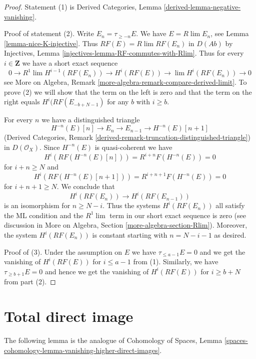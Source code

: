\begin{proof}
Statement (1) is
Derived Categories, Lemma \ref{derived-lemma-negative-vanishing}.

\medskip\noindent
Proof of statement (2). Write $E_n = \tau_{\geq -n}E$. We have
$E = R\lim E_n$, see Lemma \ref{lemma-nice-K-injective}. Thus
$RF(E) = R\lim RF(E_n)$ in $D(\textit{Ab})$ by Injectives, Lemma
\ref{injectives-lemma-RF-commutes-with-Rlim}. Thus for every $i \in \mathbf{Z}$
we have a short exact sequence
$$
0 \to R^1\lim H^{i - 1}(RF(E_n)) \to H^i(RF(E)) \to \lim H^i(RF(E_n)) \to 0
$$
see More on Algebra, Remark
\ref{more-algebra-remark-compare-derived-limit}.
To prove (2) we will show that the term on the left is zero
and that the term on the right equals $H^i(RF(E_{-b + N - 1})$
for any $b$ with $i \geq b$.

\medskip\noindent
For every $n$ we have a distinguished triangle
$$
H^{-n}(E)[n] \to E_n \to E_{n - 1} \to H^{-n}(E)[n + 1]
$$
(Derived Categories, Remark
\ref{derived-remark-truncation-distinguished-triangle})
in $D(\mathcal{O}_X)$. Since $H^{-n}(E)$ is quasi-coherent we have
$$
H^i(RF(H^{-n}(E)[n])) = R^{i + n}F(H^{-n}(E)) = 0
$$
for $i + n \geq N$ and
$$
H^i(RF(H^{-n}(E)[n + 1])) = R^{i + n + 1}F(H^{-n}(E)) = 0
$$
for $i + n + 1 \geq N$. We conclude that
$$
H^i(RF(E_n)) \to H^i(RF(E_{n - 1}))
$$
is an isomorphism for $n \geq N - i$. Thus the systems $H^i(RF(E_n))$ all
satisfy the ML condition and the $R^1\lim$ term in our short exact
sequence is zero (see discussion in
More on Algebra, Section \ref{more-algebra-section-Rlim}).
Moreover, the system $H^i(RF(E_n))$ is constant starting
with $n = N - i - 1$ as desired.

\medskip\noindent
Proof of (3). Under the assumption on $E$ we have
$\tau_{\leq a - 1}E = 0$ and we get the vanishing
of $H^i(RF(E))$ for $i \leq a - 1$ from (1).
Similarly, we have $\tau_{\geq b + 1}E = 0$ and hence
we get the vanishing of $H^i(RF(E))$ for $i \geq b + N$ from
part (2).
\end{proof}









\section{Total direct image}
\label{section-total-direct-image}

\noindent
The following lemma is the analogue of
Cohomology of Spaces, Lemma
\ref{spaces-cohomology-lemma-vanishing-higher-direct-images}.

